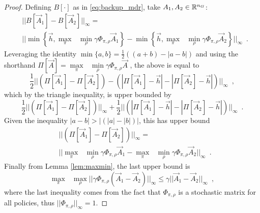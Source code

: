 \begin{proof} Defining $B[\cdot]$ as in \eqref{eq:backup_mdr}, take $A_1, A_2 \in \mathbb{R}^{n_G}$:
\begin{equation*}
\begin{split}
&||B[\vec{A}_1] - B[\vec{A}_2]||_{\infty}=\\
&||\min\left\{ \vec{h}, \underset{\pi}{\max}\text{ }\underset{ \rho}{\min} \gamma \Phi_{\pi, \rho} \vec{A}_1 \right \}  - \min\left\{ \vec{h}, \underset{\pi}{\max}\text{ }\underset{ \rho}{\min} \gamma \Phi_{\pi, \rho} \vec{A}_2 \right \}||_{\infty}
\enspace .
\end{split}
\end{equation*}%
\noindent Leveraging the identity $\min\{a,b\} = \frac{1}{2}((a+b)- |a-b|)$ and using the shorthand $\Pi[\vec{A}]=\underset{\pi}{\max}\text{ }\underset{ \rho}{\min} \gamma \Phi_{\pi, \rho} \vec{A}$ , the above is equal to 
%
\begin{equation*}
\frac{1}{2} ||(\Pi[\vec{A}_1]  - \Pi[\vec{A}_2] ) -  (|\Pi[\vec{A}_1]-\vec{h}|  - |\Pi[\vec{A}_2]-\vec{h}|)||_{\infty} \enspace,
\end{equation*}%
\noindent which by the triangle inequality, is upper bounded by
%
\begin{equation*}
\frac{1}{2} ||(\Pi[\vec{A}_1]  - \Pi[\vec{A}_2] )||_{\infty} + \frac{1}{2}  ||(|\Pi[\vec{A}_1]-\vec{h}|  - |\Pi[\vec{A}_2]-\vec{h}|)||_{\infty} \enspace.
\end{equation*}%
\noindent Given the inequality $|a-b| > |(|a|-|b|)|$, this has upper bound
%
\begin{equation*}
\begin{split}
&||(\Pi[\vec{A}_1]  - \Pi[\vec{A}_2] )||_{\infty}=\\ 
&||\underset{\pi}{\max}\text{ }\underset{ \rho}{\min} \gamma \Phi_{\pi, \rho}\vec{A}_1 - \underset{\pi}{\max}\text{ }\underset{ \rho}{\min} \gamma \Phi_{\pi, \rho} \vec{A}_2||_{\infty} \enspace.
\end{split}
\end{equation*}%
\noindent Finally from Lemma \ref{lem:maxmin}, the last upper bound is 
\begin{equation*}
\underset{\pi}{\max}\text{ }\underset{ \rho}{\max} ||\gamma \Phi_{\pi, \rho} (\vec{A}_1 - \vec{A}_2)||_{\infty} \leq \gamma||\vec{A}_1 - \vec{A}_2||_{\infty} \enspace,
\end{equation*}%
\noindent where the last inequality comes from the fact that $\Phi_{\pi, \rho}$ is a stochastic matrix for all policies, thus $||\Phi_{\pi, \rho}||_{\infty} = 1$.
\end{proof}



